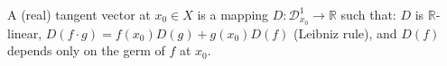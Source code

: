 A (real) tangent vector at $x_0 \in X$ is a mapping $D: \mathcal{D}_{x_0}^1 \to \mathbb{R}$ such that: $D$ is $\mathbb{R}$-linear, $D(f \cdot g) = f(x_0)D(g) + g(x_0)D(f)$ (Leibniz rule), and $D(f)$ depends only on the germ of $f$ at $x_0$.
